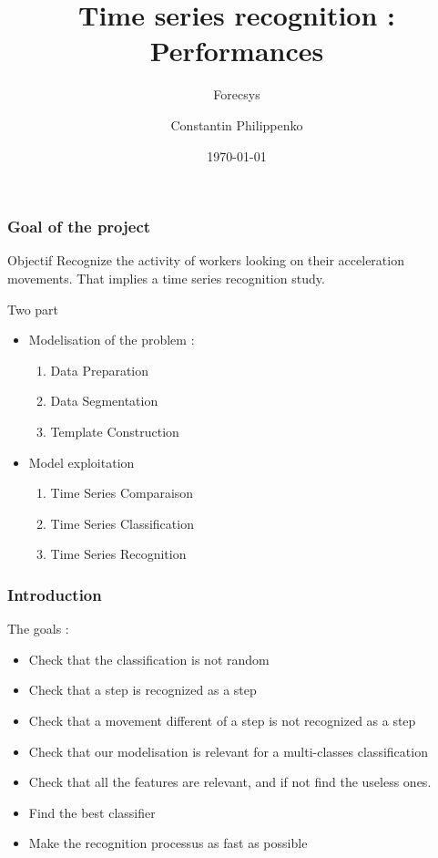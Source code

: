 \documentclass[11pt, sans]{beamer}
\title[Présentation]{Time series recognition : Performances}
\subtitle[\ldots]{Forecsys}
\author{Constantin Philippenko}
\institute[MIPT]{Moscou}
\date{\today}
\begin{document}
\begin{frame}
\titlepage
\end{frame}

\begin{frame}
	\frametitle{Goal of the project}
	
	\begin{alertblock}{Objectif}
	Recognize the activity of workers looking on their acceleration movements. That implies a time series recognition study.
	\end{alertblock}
	
	\begin{block}{Two part}
	\begin{itemize}
		\item Modelisation of the problem :
			\begin{enumerate}
				\item Data Preparation
				\item Data Segmentation
				\item Template Construction
			\end{enumerate}
		\item Model exploitation	
			\begin{enumerate}
				\item Time Series Comparaison
				\item Time Series Classification
				\item Time Series Recognition
			\end{enumerate}			 
	\end{itemize}
	
	\end{block}
	
\end{frame}

\begin{frame}
	\frametitle{Introduction}
	
	The goals :
	\begin{itemize}
		\item Check that the classification is not random
		\item Check that a step is recognized as a step
		\item Check that a movement different of a step is not recognized as a step
		\item Check that our modelisation is relevant for a multi-classes classification
		\item Check that all the features are relevant, and if not find the useless ones.
		\item Find the best classifier
		\item Make the recognition processus as fast as possible
	\end{itemize}
		
\end{frame}
\end{document}
